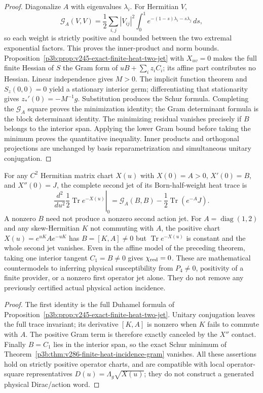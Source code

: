\documentclass[12pt,a4paper]{article}
\begin{document}
\begin{proof}
Diagonalize $A$ with eigenvalues $\lambda_i$. For Hermitian $V$,
\[
 \mathcal G_A(V,V)=\frac12\sum_{i,j}|V_{ij}|^2
 \int_0^1e^{-(1-s)\lambda_i-s\lambda_j}\,ds,
\]
so each weight is strictly positive and bounded between the two
extremal exponential factors. This proves the inner-product and norm
bounds.  Proposition~\ref{p3b:prop:v245-exact-finite-heat-two-jet}
with $X_{uv}=0$ makes the full finite Hessian of $S$ the Gram form of
$uB+\sum_i z_iC_i$; its affine part contributes no Hessian.
Linear independence gives $M>0$. The implicit function theorem and
$S_z(0,0)=0$ yield a stationary interior germ; differentiating that
stationarity gives $z_*'(0)=-M^{-1}g$. Substitution produces the Schur
formula. Completing the $\mathcal G_A$ square proves the minimization
identity; the Gram determinant formula is the block determinant
identity.  The minimizing residual vanishes precisely if $B$ belongs
to the interior span.  Applying the lower Gram bound before taking
the minimum proves the quantitative inequality.  Inner products and
orthogonal projections are unchanged by basis reparametrization and
simultaneous unitary conjugation.
\end{proof}

\begin{proposition}
\label{p3b:prop:v286-heat-incidence-contact-obstruction}
For any $C^2$ Hermitian matrix chart $X(u)$ with $X(0)=A>0$,
$X'(0)=B$, and $X''(0)=J$, the complete second jet of its
Born-half-weight heat trace is
\begin{equation}
 \label{p3b:eq:v286-contact-obstruction}
 \left.\frac{d^2}{du^2}\frac12\operatorname{Tr}e^{-X(u)}
 \right|_{0}=\mathcal G_A(B,B)
 -\frac12\operatorname{Tr}(e^{-A}J).
\end{equation}
A nonzero $B$ need not produce a nonzero second action jet. For
$A=\operatorname{diag}(1,2)$ and any skew-Hermitian $K$ not commuting
with $A$, the positive chart $X(u)=e^{uK}Ae^{-uK}$ has
$B=[K,A]\ne0$ but $\operatorname{Tr}e^{-X(u)}$ is constant and the
whole second jet vanishes. Even in the affine model of the preceding
theorem, taking one interior tangent $C_1=B\ne0$ gives
$\chi_{\rm red}=0$.  These are mathematical countermodels to inferring
physical susceptibility from $P_4\ne0$, positivity of a finite
provider, or a nonzero first operator jet alone.  They do not remove
any previously certified actual physical action incidence.
\end{proposition}
\begin{proof}
The first identity is the full Duhamel formula of
Proposition~\ref{p3b:prop:v245-exact-finite-heat-two-jet}.
Unitary conjugation leaves the full trace invariant; its derivative
$[K,A]$ is nonzero when $K$ fails to commute with $A$. The positive
Gram term is therefore exactly canceled by the $X''$ contact.
Finally $B=C_1$ lies in the interior span, so the exact Schur minimum
of Theorem~\ref{p3b:thm:v286-finite-heat-incidence-gram} vanishes. All these assertions hold on strictly positive operator
charts, and are compatible with local operator-square
representatives $D(u)=\Lambda_g\sqrt{X(u)}$; they do not construct a
generated physical Dirac/action word.
\end{proof}
\end{document}
